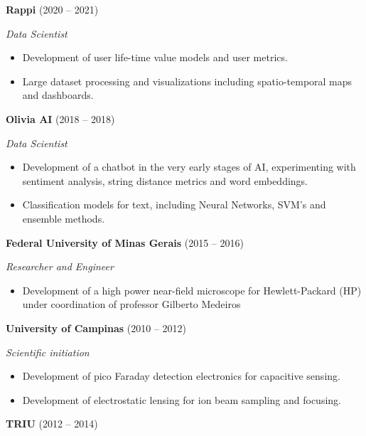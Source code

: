 \documentclass[10pt,a4paper]{article}
\begin{document}
\vspace{6pt}

\textbf{Rappi} (2020 -- 2021)

\textit{Data Scientist} 
\begin{itemize}[noitemsep, topsep=0pt]
	\item Development of user life-time value models and user metrics.
	\item Large dataset processing and visualizations including spatio-temporal maps and dashboards.
\end{itemize}

\vspace{6pt}

\textbf{Olivia AI} (2018 -- 2018)

\textit{Data Scientist} 
\begin{itemize}[noitemsep, topsep=0pt]
	\item Development of a chatbot in the very early stages of AI, experimenting with sentiment analysis, string distance metrics and word embeddings.
	\item Classification models for text, including Neural Networks, SVM's and ensemble methods.
\end{itemize}

\vspace{6pt}

\textbf{Federal University of Minas Gerais} (2015 -- 2016)

\textit{Researcher and Engineer} 
\begin{itemize}[noitemsep, topsep=0pt]
	\item Development of a high power near-field microscope for Hewlett-Packard (HP) under coordination of professor Gilberto Medeiros
\end{itemize}

\vspace{6pt}

\textbf{University of Campinas} (2010 -- 2012)

\textit{Scientific initiation} 
\begin{itemize}[noitemsep, topsep=0pt]
	\item Development of pico Faraday detection electronics for capacitive sensing.
	\item Development of electrostatic lensing for ion beam sampling and focusing.
\end{itemize}

\vspace{6pt}

\textbf{TRIU} (2012 -- 2014)
\end{document}
